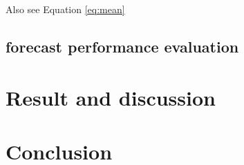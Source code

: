 \documentclass[]{elsarticle} %
\begin{document}
Also see Equation \eqref{eq:mean}

\hypertarget{accuracy}{%
\subsection{forecast performance evaluation}\label{accuracy}}

\hypertarget{result}{%
\section{Result and discussion}\label{result}}

\hypertarget{conclusion}{%
\section{Conclusion}\label{conclusion}}

\renewcommand\refname{References}

\end{document}
